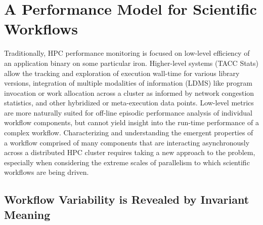 \documentclass[12pt, conference, compsocconf]{IEEEtran}
\begin{document}
\section{A Performance Model for Scientific Workflows}
Traditionally, HPC performance monitoring is focused on low-level efficiency of 
an application binary on some particular iron.  Higher-level systems (TACC 
Stats) allow the tracking and exploration of execution wall-time for various 
library versions, integration of multiple modalities of information (LDMS) like 
program invocation or work allocation across a cluster as informed by network 
congestion statistics, and other hybridized or meta-execution data points. 
Low-level metrics are more naturally suited for off-line episodic 
performance analysis of individual workflow components, but cannot yield insight 
into the run-time performance of a complex workflow.  Characterizing and 
understanding the emergent properties of a workflow comprised 
of many components that are interacting asynchronously across a distributed HPC 
cluster requires taking a new approach to the problem, especially when 
considering the extreme scales of parallelism to which scientific workflows are 
being driven. 
\subsection{Workflow Variability is Revealed by Invariant Meaning}
\end{document}
